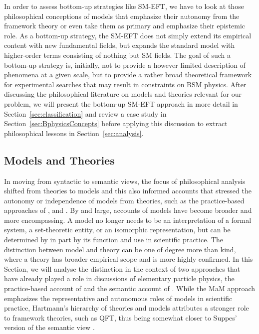 In order to assess bottom-up strategies like SM-EFT, we have to look at those philosophical conceptions of models that emphasize their autonomy from the framework theory or even take them as primary and emphasize their epistemic role. 
As a bottom-up strategy, the SM-EFT does not simply extend its empirical content with new fundamental fields, but expands the standard model with higher-order terms consisting of nothing but SM fields.
The goal of such a bottom-up strategy is, initially, not to provide a however limited description of phenomena at a given scale, but to provide a rather broad theoretical framework for experimental searches that may result in constraints on BSM physics.
After discussing the philosophical literature on models and theories relevant for our problem, we will present the bottom-up SM-EFT approach in more detail in Section~\ref{sec:classification} and review a case study in Section~\ref{sec:BphysicsConcepts} before applying this discussion to extract philosophical lessons in Section~\ref{sec:analysis}.

\subsection{Models and Theories}
\label{sub:modeltheory}

In moving from syntactic to semantic views, the focus of philosophical analysis shifted from theories to models and this also informed accounts that stressed the autonomy or independence of models from theories, such as the practice-based approaches of \citet{cartwright99}, and \citet{morganmorrison}.
By and large, accounts of models have become broader and more encompassing.
A model no longer needs to be an interpretation of a formal system, a set-theoretic entity, or an isomorphic representation, but can be determined by in part by its function and use in scientific practice.
The distinction between model and theory can be one of degree more than kind, where a theory has broader empirical scope and is more highly confirmed. 
In this Section, we will analyse the distinction in the context of two approaches that have already played a role in discussions of elementary particle physics, the practice-based account of \citet{morganmorrison} and the semantic account of \citet{hartmann1998}. 
While the MaM approach emphasizes the representative and autonomous roles of models in scientific practice, Hartmann's  hierarchy of theories and models attributes a stronger role to framework theories, such as QFT, thus being somewhat closer to Suppes' version of the semantic view \citep{suppes1962}. 


